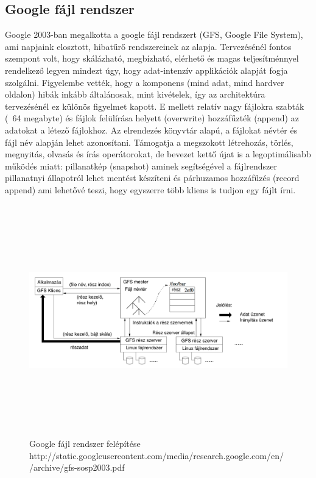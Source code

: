 \documentclass[a4paper,12pt]{article}
\begin{document}
\subsection{Google fájl rendszer}
Google 2003-ban megalkotta a google fájl rendszert (GFS, Google File System)\cite{gfs}, ami napjaink elosztott, hibatűrő rendszereinek az alapja. Tervezésénél fontos szempont volt, hogy skálázható, megbízható, elérhető és magas teljesítménnyel rendelkező legyen mindezt úgy, hogy adat-intenzív applikációk alapját fogja szolgálni. Figyelembe vették, hogy a komponens (mind adat, mind hardver oldalon) hibák inkább általánosak, mint kivételek, így az architektúra tervezésénél ez különös figyelmet kapott. E mellett relatív nagy fájlokra szabták (~64 megabyte) és fájlok felülírása helyett (overwrite) 
hozzáfűzték (append) az adatokat a létező fájlokhoz. Az elrendezés könyvtár alapú, a fájlokat névtér és fájl név alapján lehet azonosítani. Támogatja a megszokott létrehozás, törlés, megnyitás, olvasás és írás operátorokat, de bevezet kettő újat is a legoptimálisabb működés miatt: pillanatkép (snapshot) aminek segítségével a fájlrendszer pillanatnyi állapotról lehet mentést készíteni és párhuzamos hozzáfűzés (record append) ami lehetővé teszi, hogy egyszerre több kliens is tudjon egy fájlt írni. 

\begin{figure}[ht!]
\centering
\includegraphics[width=130mm, height=100mm, keepaspectratio]{img/gfs.png}
\caption{Google fájl rendszer felépítése
http://static.googleusercontent.com/media/research.google.com/en//archive/gfs-sosp2003.pdf \label{gfs}}
\end{figure}
\end{document}
